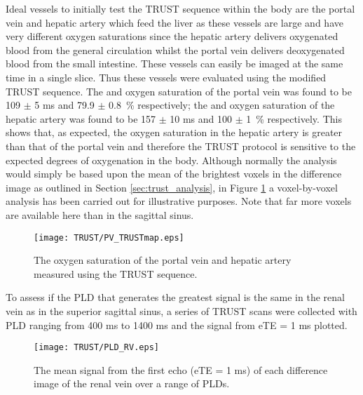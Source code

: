 Ideal vessels to initially test the \ac{TRUST} sequence within the body are the portal vein and hepatic artery which feed the liver as these vessels are large and have very different oxygen saturations since the hepatic artery delivers oxygenated blood from the general circulation whilst the portal vein delivers deoxygenated blood from the small intestine. These vessels can easily be imaged at the same time in a single slice. Thus these vessels were evaluated using the modified \ac{TRUST} sequence. The \ttwo and oxygen saturation of the portal vein was found to be 109 $\pm$ 5 ms and 79.9 $\pm$ 0.8~\% respectively; the \ttwo and oxygen saturation of the hepatic artery was found to be 157 $\pm$ 10 ms and 100 $\pm$ 1~\% respectively. This shows that, as expected, the oxygen saturation in the hepatic artery is greater than that of the portal vein and therefore the \ac{TRUST} protocol is sensitive to the expected degrees of oxygenation in the body. Although normally the analysis would simply be based upon the mean of the brightest voxels in the difference image as outlined in Section \ref{sec:trust_analysis}, in Figure \ref{fig:pv_TRUST} a voxel-by-voxel analysis has been carried out for illustrative purposes. Note that far more voxels are available here than in the sagittal sinus.

\begin{figure}[h]
	\centering
	\texttt{[image: TRUST/PV\_TRUSTmap.eps]}
	\caption{The oxygen saturation of the portal vein and hepatic artery measured using the \ac{TRUST} sequence.}
	\label{fig:pv_TRUST}	
\end{figure}
To assess if the \ac{PLD} that generates the greatest signal is the same in the renal vein as in the superior sagittal sinus, a series of \ac{TRUST} scans were collected with \ac{PLD} ranging from 400 ms to 1400 ms and the signal from \ac{eTE} = 1 ms plotted.

\begin{figure}[H]
	\centering
	\texttt{[image: TRUST/PLD\_RV.eps]}
	\caption{The mean signal from the first echo (\ac{eTE} = 1 ms) of each difference image of the renal vein over a range of \acp{PLD}.}
	\label{fig:Sig_vs_PLD_RV}
\end{figure}

